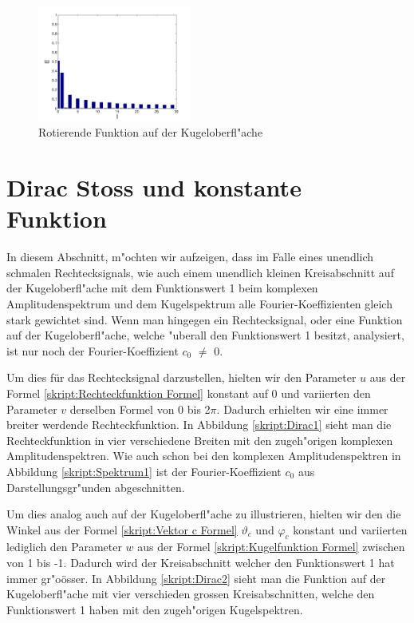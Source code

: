 \begin{refsection}
\begin{figure}
\includegraphics[width=0.45\textwidth]{kugel/kSpektrum/Kugel_4_2.pdf}
\caption{Rotierende Funktion auf der Kugeloberfl"ache
\label{skript:Spektrum2}}
\end{figure}

\section{Dirac Stoss und konstante Funktion}

In diesem Abschnitt, m"ochten wir aufzeigen, dass im Falle eines 
unendlich schmalen Rechtecksignals, wie auch einem unendlich kleinen 
Kreisabschnitt auf der Kugeloberfl"ache mit dem Funktionswert 1 beim 
komplexen Amplitudenspektrum und dem Kugelspektrum alle 
Fourier-Koeffizienten gleich stark gewichtet sind. Wenn man hingegen 
ein Rechtecksignal, oder eine Funktion auf der Kugeloberfl"ache, welche 
"uberall den Funktionswert 1 besitzt, analysiert, ist nur noch der 
Fourier-Koeffizient $c_0$ $\neq$ 0.

Um dies für das Rechtecksignal darzustellen, hielten wir den Parameter
$u$ aus der Formel \ref{skript:Rechteckfunktion Formel} konstant auf 0 
und variierten den Parameter $v$ derselben Formel von 0 bis 2$\pi$. 
Dadurch erhielten wir eine immer breiter werdende Rechteckfunktion. 
In Abbildung \ref{skript:Dirac1} sieht man die Rechteckfunktion in 
vier verschiedene Breiten mit den zugeh"origen komplexen 
Amplitudenspektren. 
Wie auch schon bei den komplexen Amplitudenspektren in Abbildung
\ref{skript:Spektrum1} ist der Fourier-Koeffizient $c_0$ aus 
Darstellungsgr"unden abgeschnitten.

Um dies analog auch auf der Kugeloberfl"ache zu illustrieren, hielten 
wir den die Winkel aus der Formel \ref{skript:Vektor c Formel} 
$\vartheta_c$ und $\varphi_c$ konstant und variierten lediglich den 
Parameter $w$ aus der Formel \ref{skript:Kugelfunktion Formel} 
zwischen von 1 bis -1. 
Dadurch wird der Kreisabschnitt welcher den Funktionswert 1 hat immer 
gr"oösser. 
In Abbildung \ref{skript:Dirac2} sieht man die Funktion auf der 
Kugeloberfl"ache mit vier verschieden grossen Kreisabschnitten, welche 
den Funktionswert 1 haben mit den zugeh"origen Kugelspektren.


\end{refsection}
